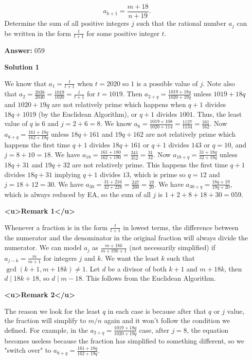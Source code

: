 \begin{enumerate}
 
 \[a_{k+1} = \frac{m + 18}{n+19}.\]Determine the sum of all positive integers $j$ such that the rational number $a_j$ can be written in the form $\frac{t}{t+1}$ for some positive integer $t$.


 
 \textbf{Answer: }059



\textbf{Solution 1}

We know that $a_{1}=\frac{t}{t+1}$ when $t=2020$ so $1$ is a possible value of $j$. Note also that $a_{2}=\frac{2038}{2040}=\frac{1019}{1020}=\frac{t}{t+1}$ for $t=1019$. Then $a_{2+q}=\frac{1019+18q}{1020+19q}$ unless $1019+18q$ and $1020+19q$ are not relatively prime which happens when $q+1$ divides $18q+1019$ (by the Euclidean Algorithm), or $q+1$ divides $1001$. Thus, the least value of $q$ is $6$ and $j=2+6=8$. We know $a_{8}=\frac{1019+108}{1020+114}=\frac{1127}{1134}=\frac{161}{162}$. Now $a_{8+q}=\frac{161+18q}{162+19q}$ unless $18q+161$ and $19q+162$ are not relatively prime which happens the first time $q+1$ divides $18q+161$ or $q+1$ divides $143$ or $q=10$, and $j=8+10=18$. We have $a_{18}=\frac{161+180}{162+190}=\frac{341}{352}=\frac{31}{32}$. Now $a_{18+q}=\frac{31+18q}{32+19q}$ unless $18q+31$ and $19q+32$ are not relatively prime. This happens the first time $q+1$ divides $18q+31$ implying $q+1$ divides $13$, which is prime so $q=12$ and $j=18+12=30$. We have $a_{30}=\frac{31+216}{32+228}=\frac{247}{260}=\frac{19}{20}$. We have $a_{30+q}=\frac{18q+19}{19q+20}$, which is always reduced by EA, so the sum of all $j$ is $1+2+8+18+30=\boxed{059}$.

 \textbf{<u>Remark 1</u>}

 Whenever a fraction is in the form $\frac{t}{t+1}$ in lowest terms, the difference between the numerator and the denominator in the original fraction will always divide the numerator. We can model $a_j$ as $\frac{m+18k}{m+19k+1}$ (not necessarily simplified) if $a_{j-k}=\frac{m}{m+1}$ for integers $j$ and $k$. We want the least $k$ such that $\gcd(k+1,{m+18k})\neq1$. Let $d$ be a divisor of both $k+1$ and $m+18k$, then $d\mid18k+18$, so $d\mid{m-18}$. This follows from the Euclidean Algorithm.

 \textbf{<u>Remark 2</u>}

 The reason we look for the least $q$ in each case is because after that $q$ or $j$ value, the fraction will simplify to $m/n$ again and it won't follow the condition we defined. For example, in the $a_{2+q}=\frac{1019+18q}{1020+19q}$ case, after $j = 8$, the equation becomes useless because the fraction has simplified to something different, so we "switch over" to $a_{8+q}=\frac{161+18q}{162+19q}.$





\end{enumerate}
